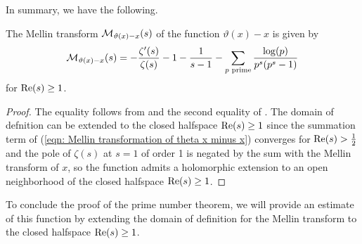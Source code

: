 In summary, we have the following. 
\begin{proposition}\label{prop: Mellin transform of theta function minus x}
    The Mellin transform $\mathcal{M}_{\vartheta(x)-x}(s)$ of the function $\vartheta(x)-x$ is given by 
    \begin{equation*}\label{eqn: Mellin transformation of theta x minus x}
        \mathcal{M}_{\vartheta(x)-x}(s)=-\frac{\zeta'(s)}{\zeta(s)}-1-\frac{1}{s-1}-\sum_{p\text{ prime}}\frac{\log(p)}{p^{s}(p^{s}-1)}
    \end{equation*}
    for $\mathrm{Re}(s)\geq1$. 
\end{proposition}
\begin{proof}
    The equality follows from  and the second equality of . The domain of defnition can be extended to the closed halfspace $\mathrm{Re}(s)\geq 1$ since the summation term of (\ref{eqn: Mellin transformation of theta x minus x}) converges for $\mathrm{Re}(s)>\frac{1}{2}$ and the pole of $\zeta(s)$ at $s=1$ of order 1 is negated by the sum with the Mellin transform of $x$, so the function admits a holomorphic extension to an open neighborhood of the closed halfspace $\mathrm{Re}(s)\geq 1$.
\end{proof}
 To conclude the proof of the prime number theorem, we will provide an estimate of this function by extending the domain of definition for the Mellin transform to the closed halfspace $\mathrm{Re}(s)\geq 1$. 